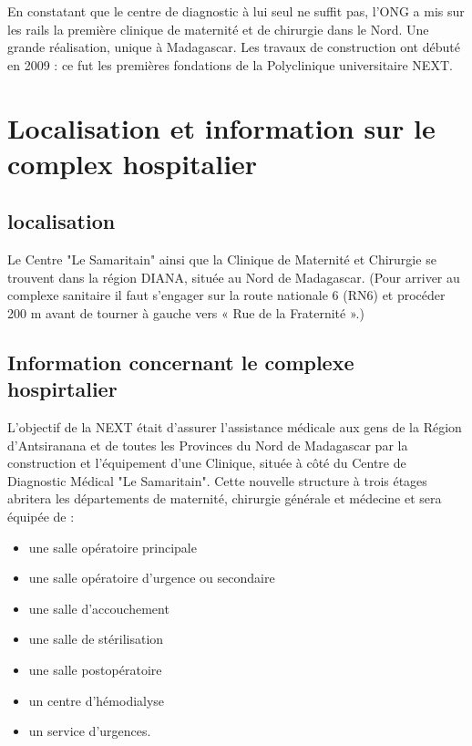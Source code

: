   	En constatant que le centre de diagnostic à lui seul ne suffit pas, l'ONG a mis sur les rails la
  	première clinique de maternité et de chirurgie dans le Nord. Une grande réalisation, unique à
  	Madagascar. Les travaux de construction ont débuté en 2009 : ce fut les premières
  	fondations de la Polyclinique universitaire NEXT.
  	
  	\medskip
  	
  
		
		\section{Localisation et  information sur le complex hospitalier}
		
		
		\subsection{localisation}
		Le Centre "Le Samaritain" ainsi que la Clinique de Maternité et Chirurgie se trouvent dans la
		région DIANA, située au Nord de Madagascar.
		(Pour arriver au complexe sanitaire il faut s'engager sur la route nationale 6 (RN6) et
		procéder 200 m avant de tourner à gauche vers « Rue de la Fraternité ».)
		
		\subsection{ Information concernant le complexe hospirtalier}
		
		L'objectif de la NEXT était d'assurer l'assistance médicale aux gens de la Région
		d'Antsiranana et de toutes les Provinces du Nord de Madagascar par la construction et
		l'équipement d'une Clinique, située à côté du Centre de Diagnostic Médical "Le Samaritain".
		Cette nouvelle structure à trois étages abritera les départements de maternité, chirurgie
		générale et médecine et sera équipée de :
		
		\begin{itemize}
			\item une salle opératoire principale

			\item une salle opératoire d'urgence ou secondaire

			\item une salle d'accouchement
			
			\item une salle de stérilisation

			\item une salle postopératoire
			
			\item un centre d'hémodialyse
			
			\item  un service d'urgences.
		\end{itemize}
		
